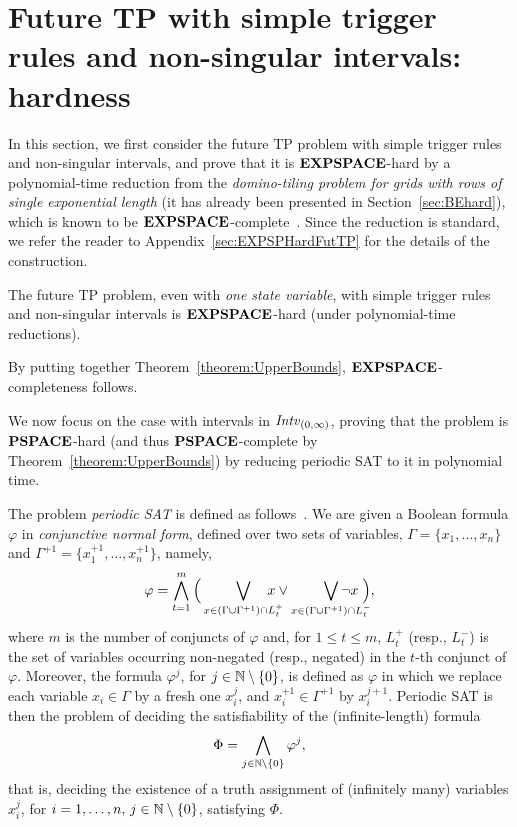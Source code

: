\section[Future TP, simple trigger rules, non-singular intervals: hardness]{Future TP with simple trigger rules and non-singular intervals: hardness\label{sec:pspace}}

In this section, we first consider the future TP problem with simple trigger rules and non-singular intervals, and prove that it is $\textbf{EXPSPACE}$-hard by a polynomial-time reduction from the \emph{domino-tiling problem for grids with rows of single exponential length} (it has already been presented in Section~\ref{sec:BEhard}), which is known to be  $\textbf{EXPSPACE}$-complete~\cite{harel92}. Since the reduction is standard, we refer the reader to Appendix~\ref{sec:EXPSPHardFutTP} for the details of the construction.

\begin{theorem}\label{theorem:EXPSPlowerBound} 
The future TP problem, even with \emph{one state variable}, with simple trigger rules and non-singular intervals is $\textbf{EXPSPACE}$-hard (under polynomial-time reductions).
\end{theorem}
By putting together Theorem~\ref{theorem:UpperBounds}, $\textbf{EXPSPACE}$-completeness follows.

We now focus on the case 
with intervals in ${\mathit{Intv}}_{(0,\infty)}$, proving that the problem is $\textbf{PSPACE}$-hard (and thus $\textbf{PSPACE}$-complete by Theorem~\ref{theorem:UpperBounds}) by reducing periodic SAT to it in polynomial time.

The problem \emph{periodic SAT} is defined as follows~\cite{Pap94}.
We are given a Boolean formula $\varphi$ in \emph{conjunctive normal form},
defined over two sets of variables, $\Gamma=\{x_1,\ldots, x_n\}$ and $\Gamma^{+1}=\{x_1^{+1},\ldots , x_n^{+1}\}$, namely,
\[
    \varphi = \bigwedge_{t=1}^m \Big(\smashoperator[r]{\bigvee_{x\in (\Gamma \cup \Gamma^{+1})\cap L^+_t}}\quad x  \vee \smashoperator[r]{\bigvee_{x\in (\Gamma \cup \Gamma^{+1})\cap L^-_t}}  \neg x\;\Big),
\]
where $m$ is the number of conjuncts of $\varphi$ and, for $1\leq t\leq m$, $L^+_t$ (resp., $L^-_t$) is the set of variables occurring non-negated (resp., negated) in the $t$-th conjunct of $\varphi$.
%
Moreover, the formula $\varphi^j$, for $j\in\mathbb{N}\setminus\{0\}$, is defined as $\varphi$ in which we replace each variable
$x_i\in \Gamma$ by a fresh one $x_i^j$, and $x_i^{+1}\in \Gamma^{+1}$ by $x_i^{j+1}$.
Periodic SAT is then the problem of deciding the satisfiability of the (infinite-length) formula 
\[\Phi= \bigwedge_{j\in\mathbb{N}\setminus\{0\}} \varphi^j,\] that is, deciding the existence 
of a truth assignment of (infinitely many) variables $x_i^j$, for $i=1,\ldots, n,\, j\in\mathbb{N}\setminus\{0\}$, satisfying $\Phi$.

